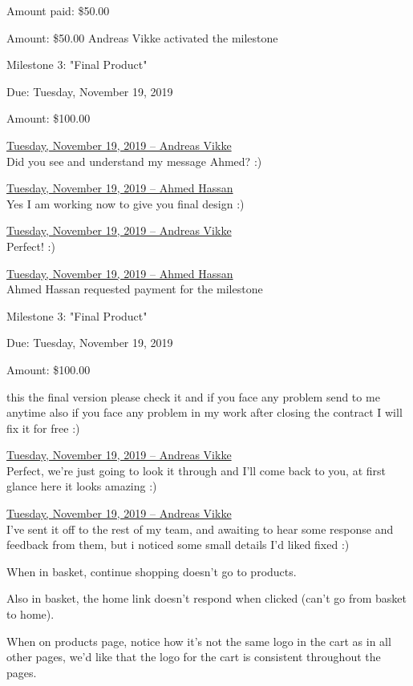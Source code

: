 \documentclass[11pt]{report}
\begin{document}
Amount paid: \$50.00

Amount: \$50.00
\newpage
\noindent Andreas Vikke activated the milestone

Milestone 3: "Final Product"

Due: Tuesday, November 19, 2019

Amount: \$100.00


\noindent\underline{Tuesday, November 19, 2019 – Andreas Vikke}\\
\noindent Did you see and understand my message Ahmed? :)

\noindent\underline{Tuesday, November 19, 2019 – Ahmed Hassan}\\
\noindent Yes I am working now to give you final design :)

\noindent\underline{Tuesday, November 19, 2019 – Andreas Vikke}\\
\noindent Perfect! :)

\noindent\underline{Tuesday, November 19, 2019 – Ahmed Hassan}\\
\noindent Ahmed Hassan requested payment for the milestone

\noindent Milestone 3: "Final Product"

Due: Tuesday, November 19, 2019

Amount: \$100.00    

\noindent this the final version please check it and if you face any problem send to me anytime also if you face any problem in my work after closing the contract I will fix it for free :)


\noindent\underline{Tuesday, November 19, 2019 – Andreas Vikke}\\
\noindent Perfect, we're just going to look it through and I'll come back to you, at first glance here it looks amazing :)

\noindent\underline{Tuesday, November 19, 2019 – Andreas Vikke}\\
\noindent I've sent it off to the rest of my team, and awaiting to hear some response and feedback from them, but i noticed some small details I'd liked fixed :)

\noindent When in basket, continue shopping doesn't go to products.

\noindent Also in basket, the home link doesn't respond when clicked (can't go from basket to home).

\noindent When on products page, notice how it's not the same logo in the cart as in all other pages, we'd like that the logo for the cart is consistent throughout the pages.
\end{document}

